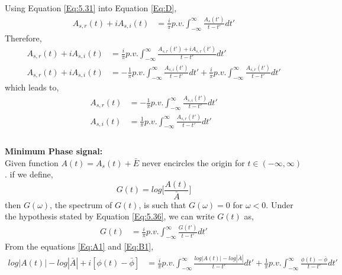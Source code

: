 Using Equation \ref{Eq:5.31} into Equation \ref{Eq:D},
\begin{equation}
\begin{split}
A_{s,r}(t)+iA_{s,i}(t) &=\frac{i}{\pi} p.v. \int_{-\infty}^{\infty} \frac{A_s(t')}{t-t'} dt' 
\end{split}
\label{Eq:5.36}
\end{equation}
Therefore,
\begin{equation}
\begin{split}
A_{s,r}(t)+iA_{s,i}(t) &=\frac{i}{\pi} p.v. \int_{-\infty}^{\infty} \frac{A_{s,r}(t')+iA_{s,r}(t')}{t-t'} dt' \\
A_{s,r}(t)+iA_{s,i}(t)&=-\frac{1}{\pi} p.v. \int_{-\infty}^{\infty} \frac{A_{s,i}(t')}{t-t'} dt' + \frac{i}{\pi} p.v. \int_{-\infty}^{\infty} \frac{A_{s,r}(t')}{t-t'} dt'
\end{split}
\label{Eq:5.37}
\end{equation}
which leads to,
\begin{equation}
\begin{split}
A_{s,r}(t) &=-\frac{1}{\pi} p.v. \int_{-\infty}^{\infty} \frac{A_{s,i}(t')}{t-t'} dt' \\
A_{s,i}(t) &=\frac{1}{\pi} p.v. \int_{-\infty}^{\infty} \frac{A_{s,r}(t')}{t-t'} dt' \\
\end{split}
\label{Eq:5.38}
\end{equation}\\
\textbf{Minimum Phase signal:}\\
Given function $A(t)=A_{s}(t)+\bar{E}$ never encircles the origin for $t\in(-\infty,\infty)$. if we define,
\begin{equation}
G(t)=log\bigg[\dfrac{A(t)}{\bar{A}}\bigg]
\label{Eq:A1}
\end{equation} 
then $G(\omega)$, the spectrum of $G(t)$, is such that $G(\omega)=0$ for $\omega<0$. Under the hypothesis stated by Equation \ref{Eq:5.36}, we can write $G(t)$ as,
\begin{equation}
\begin{split}
G(t) &=\frac{i}{\pi} p.v. \int_{-\infty}^{\infty} \frac{G(t')}{t-t'} dt' 
\end{split}
\label{Eq:B1}
\end{equation}
From the equations \ref{Eq:A1} and \ref{Eq:B1},
\begin{equation}
\begin{split}
log|A(t)|-log|\bar{A}|+i[\phi(t)-\bar{\phi}] &=\frac{i}{\pi} p.v. \int_{-\infty}^{\infty} \frac{log|A(t)|-log|\bar{A}|}{t-t'} dt' + \frac{1}{\pi} p.v. \int_{-\infty}^{\infty} \frac{\phi(t)-\bar{\phi}}{t-t'} dt' 
\end{split}
\label{Eq:C1}
\end{equation}
